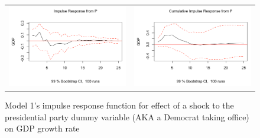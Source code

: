 \documentclass[a4paper, 12pt]{article}
\begin{document}
\begin{figure}
    \centering
    \begin{tabular}{cc}
    \includegraphics[scale = .39]{model1/Screen Shot 2020-11-26 at 12.47.31 AM.png} & \includegraphics[scale = .39]{model1/Screen Shot 2020-11-26 at 12.47.36 AM.png} \\
    \end{tabular}
    \caption{Model 1's impulse response function for effect of a shock to the presidential party dummy variable (AKA a Democrat taking office) on GDP growth rate}
    \label{fig:my_label}
\end{figure}
\end{document}
